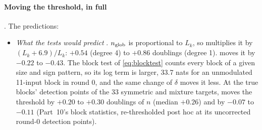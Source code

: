 \paragraph{Moving the threshold, in full} . The predictions:
\begin{itemize}
\item \emph{What the tests would predict} . $n_{\rm glob}$ is proportional to $L_k$, so  multiplies it by $(L_k+6.9)/L_k$: $+0.54$ (degree 4) to $+0.86$ doublings (degree 1).  moves it by $-0.22$ to $-0.43$. The block test of \cref{eq:blocktest} counts every block of a given size and sign pattern, so its log term is larger, 33.7 nats for an unmodulated 11-input block in round 0, and the same change of $\delta$ moves it less. At the true blocks' detection points of the 33 symmetric and mixture targets,  moves the threshold by $+0.20$ to $+0.30$ doublings of $n$ (median $+0.26$) and  by $-0.07$ to $-0.11$ (Part~10's block statistics, re-thresholded post hoc at its uncorrected round-0 detection points).
\end{itemize}
